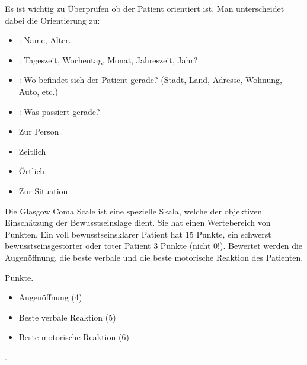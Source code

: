 {%
\label{topic:orientierung}
%
Es ist wichtig zu Überprüfen ob der Patient orientiert ist.
Man unterscheidet dabei die Orientierung zu:  
\begin{itemize}
  \item {}: Name, Alter.
  \item {}: Tageszeit,
  Wochentag, Monat, Jahreszeit, Jahr?
  \item {}: Wo befindet sich der Patient gerade?
  \newline
  (Stadt, Land, Adresse, Wohnung, Auto, etc.)
  \item {}: Was passiert gerade?
\end{itemize}

}{
\begin{itemize}
    \item Zur Person
    \item Zeitlich
    \item Örtlich
    \item Zur Situation
\end{itemize}
}{}{}{}



{%
\label{topic:gcs}
%
Die Glasgow Coma Scale ist eine spezielle Skala, welche der
objektiven Einschätzung der Bewusstseinslage  dient. Sie
hat einen Wertebereich von  Punkten. Ein voll
bewusstseinsklarer Patient hat 15 Punkte, ein schwerst
bewusstseinsgestörter oder toter Patient 3 Punkte (nicht
0!). Bewertet werden die Augenöffnung, die beste verbale und
die beste motorische Reaktion des
Patienten.
}{
 Punkte.
\begin{itemize}
    \item Augenöffnung (4)
    \item Beste verbale Reaktion (5)
    \item Beste motorische Reaktion (6)
\end{itemize}
.
}{}{}{}

